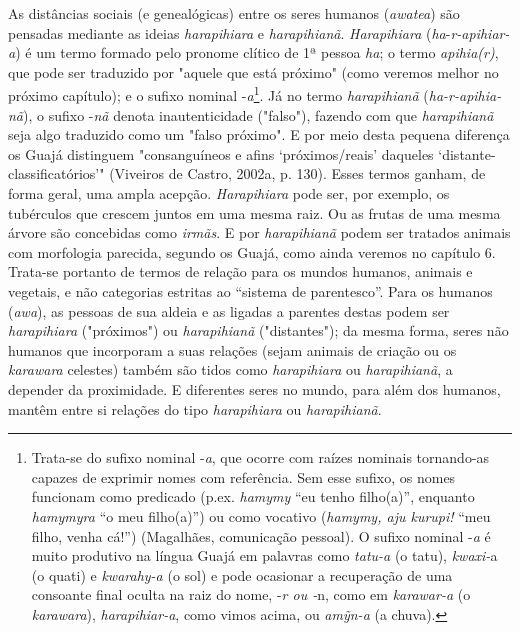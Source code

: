 As distâncias sociais (e genealógicas) entre os seres humanos
(\emph{awatea}) são pensadas mediante as ideias \emph{harapihiara} e
\emph{harapihianã}. \emph{Harapihiara} (\emph{ha}-\emph{r-apihiar-a}) é
um termo formado pelo pronome clítico de 1ª pessoa \emph{ha}; o termo
\emph{apihia(r)}, que pode ser traduzido por "aquele que está próximo"
(como veremos melhor no próximo capítulo); e o sufixo nominal
-\emph{a}\footnote{Trata-se do sufixo nominal -\emph{a}, que ocorre com
  raízes nominais tornando-as capazes de exprimir nomes com referência.
  Sem esse sufixo, os nomes funcionam como predicado (p.ex.
  \emph{hamymy} ``eu tenho filho(a)'', enquanto \emph{hamymyra} ``o meu
  filho(a)'') ou como vocativo (\emph{hamymy, aju kurupi!} ``meu filho,
  venha cá!'') (Magalhães, comunicação pessoal). O sufixo nominal
  -\emph{a} é muito produtivo na língua Guajá em palavras como
  \emph{tatu-a} (o tatu), \emph{kwaxi-}a (o quati) e \emph{kwarahy-a} (o
  sol) e pode ocasionar a recuperação de uma consoante final oculta na
  raiz do nome, -\emph{r ou -}n, como em \emph{karawar-a} (o
  \emph{karawara}), \emph{harapihiar-a}, como vimos acima, ou
  \emph{amỹn-a} (a chuva).}. Já no termo \emph{harapihianã}
(\emph{ha-r-apihia-nã}), o sufixo -\emph{nã} denota inautenticidade
("falso"), fazendo com que \emph{harapihianã} seja algo traduzido como
um "falso próximo". E por meio desta pequena diferença os Guajá
distinguem "consanguíneos e afins `próximos/reais' daqueles
`distante-classificatórios'" (Viveiros de Castro, 2002a, p. 130). Esses
termos ganham, de forma geral, uma ampla acepção. \emph{Harapihiara}
pode ser, por exemplo, os tubérculos que crescem juntos em uma mesma
raiz. Ou as frutas de uma mesma árvore são concebidas como \emph{irmãs}.
E por \emph{harapihianã} podem ser tratados animais com morfologia
parecida, segundo os Guajá, como ainda veremos no capítulo 6. Trata-se
portanto de termos de relação para os mundos humanos, animais e
vegetais, e não categorias estritas ao ``sistema de parentesco''. Para
os humanos (\emph{awa}), as pessoas de sua aldeia e as ligadas a
parentes destas podem ser \emph{harapihiara} ("próximos") ou
\emph{harapihianã} ("distantes"); da mesma forma, seres não humanos que
incorporam a suas relações (sejam animais de criação ou os
\emph{karawara} celestes) também são tidos como \emph{harapihiara} ou
\emph{harapihianã}, a depender da proximidade. E diferentes seres no
mundo, para além dos humanos, mantêm entre si relações do tipo
\emph{harapihiara} ou \emph{harapihianã}.

